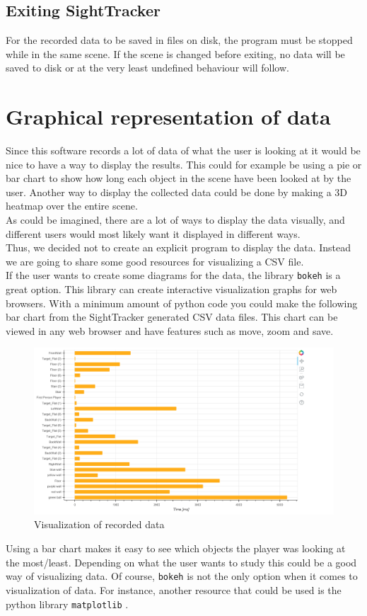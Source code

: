 \documentclass[letterpaper]{article}
\begin{document}
\subsection{Exiting SightTracker}
For the recorded data to be saved in files on disk, the program must be stopped while in the same scene. If the scene is changed before exiting, no data will be saved to disk or at the very least undefined behaviour will follow.
\section{Graphical representation of data}
Since this software records a lot of data of what the user is looking at it would be nice to have a way to display the results. This could for example be using a pie or bar chart to show how long each object in the scene have been looked at by the user. Another way to display the collected data could be done by making a 3D heatmap over the entire scene.\\[0.15in]
As could be imagined, there are a lot of ways to display the data visually, and different users would most likely want it displayed in different ways.\\[0.15in]
Thus, we decided not to create an explicit program to display the data. Instead we are going to share some good resources for visualizing a CSV file.\\[0.15in]
If the user wants to create some diagrams for the data, the library \texttt{bokeh} \cite{bokeh} is a great option. This library can create interactive visualization graphs for web browsers. With a minimum amount of python code you could make the following bar chart from the SightTracker generated CSV data files. This chart can be viewed in any web browser and have features such as move, zoom and save.
\newpage
\begin{figure}[h!]
  \centering \includegraphics[keepaspectratio,scale=0.3]{GraphStuff.png}
  \caption{Visualization of recorded data}
  \label{fig:graphvisualization}
\end{figure}
\noindent Using a bar chart makes it easy to see which objects the player was looking at the most/least. Depending on what the user wants to study this could be a good way of visualizing data.
Of course, \texttt{bokeh} \cite{bokeh} is not the only option when it comes to visualization of data. For instance, another resource that could be used is the python library \texttt{matplotlib} \cite{matplotlib}.
\newpage
\end{document}
